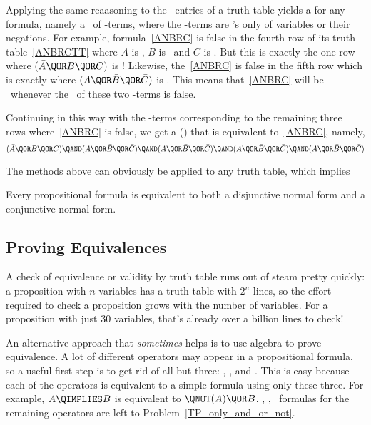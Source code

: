 Applying the same reaasoning to the \false\ entries of a truth table
yields a  for any formula, namely a \QAND\
of \QOR-terms, where the \QOR-terms are \QOR's only of variables or
their negations.  For example, formula~\eqref{ANBRC} is false in the
fourth row of its truth table~\eqref{ANBRCTT} where $A$ is \true, $B$
is \false\ and $C$ is \false.  But this is exactly the one row where
$(\bar{A} \QOR B \QOR C)$ is \false!  Likewise, the~\eqref{ANBRC} is
false in the fifth row which is exactly where
$(A \QOR \bar{B} \QOR \bar{C})$ is \false.  This means
that~\eqref{ANBRC} will be \false\ whenever the \QAND\ of these
two \QOR-terms is false.  
\iffalse
$(\bar{A} \QOR B \QOR C) \QAND (A \QOR \bar{B} \QOR \bar{C})$ is \false.
\fi
Continuing in this way with the \QOR-terms corresponding to the
remaining three rows where~\eqref{ANBRC} is false, we get a
 () that is equivalent to~\eqref{ANBRC}, namely,
\begin{equation}\label{}
(\bar{A} \QOR B \QOR C) \QAND (A \QOR \bar{B} \QOR \bar{C}) \QAND
(A \QOR \bar{B} \QOR \bar{C}) \QAND
(A \QOR \bar{B} \QOR \bar{C}) \QAND (A \QOR \bar{B} \QOR \bar{C})
\end{equation}

The methods above can obviously be applied to any truth table, which implies
\begin{theorem}
Every propositional formula is equivalent to both a disjunctive normal
form and a conjunctive normal form.
\end{theorem}

\subsection{Proving Equivalences}\label{propositional_equivalences_sec}
A check of equivalence or validity by truth table runs out of steam
pretty quickly: a proposition with $n$ variables has a truth table
with $2^n$ lines, so the effort required to check a proposition
grows  with the number of variables.  For a
proposition with just 30 variables, that's already over a billion
lines to check!

An alternative approach that \emph{sometimes} helps is to use algebra
to prove equivalence.  A lot of different operators may appear in a
propositional formula, so a useful first step is to get rid of all but
three: \QAND, \QOR, and \QNOT.  This is easy because each of the
operators is equivalent to a simple formula using only these three.
For example, $A \QIMPLIES B$ is equivalent to $\QNOT(A) \QOR
B$.  \QAND, \QOR, \QNOT\ formulas for the remaining operators are left
to Problem~\ref{TP_only_and_or_not}.


